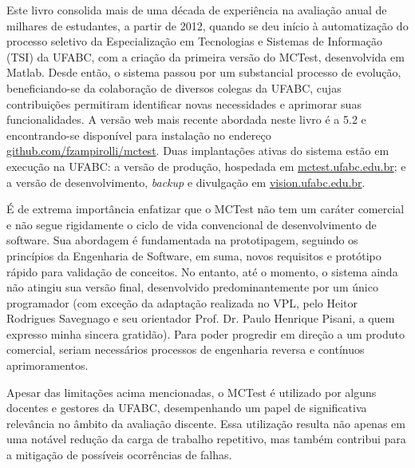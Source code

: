 Este livro consolida mais de uma década de experiência na avaliação anual de milhares de estudantes, a partir de 2012, quando se deu início à automatização do processo seletivo da Especialização em Tecnologias e Sistemas de Informação (TSI) da UFABC, com a criação da primeira versão do MCTest, desenvolvida em Matlab. Desde então, o sistema passou por um substancial processo de evolução, beneficiando-se da colaboração de diversos colegas da UFABC, cujas contribuições permitiram identificar novas necessidades e aprimorar suas funcionalidades. A versão web mais recente abordada neste livro é a 5.2 e encontrando-se disponível para instalação no endereço \href{https://github.com/fzampirolli/mctest}{github.com/fzampirolli/mctest}. Duas implantações ativas do sistema estão em execução na UFABC: a versão de produção, hospedada em \href{http://mctest.ufabc.edu.br}{mctest.ufabc.edu.br}; e a versão de desenvolvimento, \textit{backup} e divulgação em \href{http://vision.ufabc.edu.br}{vision.ufabc.edu.br}.

É de extrema importância enfatizar que o MCTest não tem um caráter comercial e não segue rigidamente o ciclo de vida convencional de desenvolvimento de software. Sua abordagem é fundamentada na prototipagem, seguindo os princípios da Engenharia de Software, em suma, novos requisitos e protótipo rápido para validação de conceitos. No entanto, até o momento, o sistema ainda não atingiu sua versão final, desenvolvido predominantemente por um único programador (com exceção da adaptação realizada no VPL, pelo Heitor Rodrigues Savegnago e seu orientador Prof. Dr. Paulo Henrique Pisani, a quem expresso minha sincera gratidão). Para poder progredir em direção a um produto comercial, seriam necessários processos de engenharia reversa e contínuos aprimoramentos. 

Apesar das limitações acima mencionadas, o MCTest é utilizado por alguns docentes e gestores da UFABC, desempenhando um papel de significativa relevância no âmbito da avaliação discente. Essa utilização resulta não apenas em uma notável redução da carga de trabalho repetitivo, mas também contribui para a mitigação de possíveis ocorrências de falhas. 

